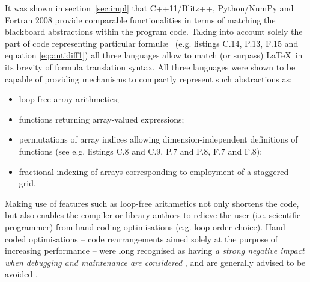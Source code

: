 \documentclass[twocolumn]{article}
\begin{document}
  It was shown in section~\ref{sec:impl} that C++11/Blitz++, Python/NumPy and Fortran 2008
    provide comparable functionalities in terms of matching the blackboard abstractions
    within the program code.
  Taking into account solely the part of code representing particular formul\ae~
    (e.g. listings C.14, P.13, F.15 and equation \ref{eq:antidiff1}) all three
    languages allow to match (or surpass) \LaTeX~in its brevity of formula translation syntax.
  All three languages were shown to be capable of providing mechanisms to compactly represent such abstractions as:
  \begin{itemize}
    \item{loop-free array arithmetics;}
    \item{functions returning array-valued expressions;}
    \item{permutations of array indices allowing dimension-independent definitions
      of functions (see e.g. listings C.8 and C.9, P.7 and P.8, F.7 and F.8);}
    \item{fractional indexing of arrays corresponding to employment of a staggered grid.}
  \end{itemize}
  
  Making use of features such as loop-free arithmetics not only shortens the code,
    but also enables the compiler or library authors to relieve the user (i.e. scientific programmer)
    from hand-coding optimisations (e.g. loop order choice).
  Hand-coded optimisations -- code rearrangements aimed solely at the purpose of increasing performance --
    were long recognised as having {\em a strong negative impact when debugging
    and maintenance are considered} \citep{Knuth_1974},
    and are generally advised to be avoided \citep[e.g.][section 3.12]{bib_CERNcpp}.
\end{document}
